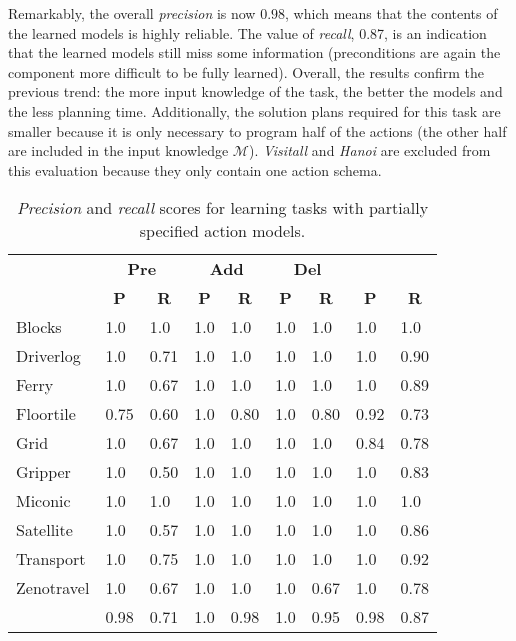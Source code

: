 \documentclass[3p,times]{elsarticle}
\begin{document}
Remarkably, the overall \emph{precision} is now $0.98$, which means that the contents of the learned models is highly reliable. The value of \emph{recall}, 0.87, is an indication that the learned models still miss some information (preconditions are again the component more difficult to be fully learned). Overall, the results confirm the previous trend: the more input knowledge of the task, the better the models and the less planning time. Additionally, the solution plans required for this task are smaller because it is only necessary to program half of the actions (the other half are included in the input knowledge $\mathcal{M}$). {\em Visitall} and {\em Hanoi} are excluded from this evaluation because they only contain one action schema.

\begin{table}[hbt!]
\begin{footnotesize}
	\begin{center}
		
		\begin{tabular}{l|l|l|l|l|l|l||l|l|}
			 & \multicolumn{2}{|c|}{\bf Pre} & \multicolumn{2}{|c|}{\bf Add} & \multicolumn{2}{|c||}{\bf Del} & \multicolumn{2}{|c}{\bf}\\ \cline{2-9}			
			  & \multicolumn{1}{|c|}{\bf P} & \multicolumn{1}{|c|}{\bf R} & \multicolumn{1}{|c|}{\bf P} & \multicolumn{1}{|c|}{\bf R} & \multicolumn{1}{|c|}{\bf P} & \multicolumn{1}{|c||}{\bf R} &  \multicolumn{1}{|c|}{\bf P} & \multicolumn{1}{|c|}{\bf R} \\
			\hline
				Blocks & 1.0 & 1.0 & 1.0 & 1.0 & 1.0 & 1.0 & 1.0 & 1.0 \\
				Driverlog & 1.0 & 0.71 & 1.0 & 1.0 & 1.0 & 1.0 & 1.0 & 0.90 \\
				Ferry & 1.0 & 0.67 & 1.0 & 1.0 & 1.0 & 1.0 & 1.0 & 0.89 \\
				Floortile & 0.75 & 0.60 & 1.0 & 0.80 & 1.0 & 0.80 & 0.92 & 0.73 \\
                Grid & 1.0 & 0.67 & 1.0 & 1.0 & 1.0 & 1.0 & 0.84 & 0.78 \\
				Gripper & 1.0 & 0.50 & 1.0 & 1.0 & 1.0 & 1.0 & 1.0 & 0.83 \\
				Miconic & 1.0 & 1.0 & 1.0 & 1.0 & 1.0 & 1.0 & 1.0 & 1.0 \\
				Satellite & 1.0 & 0.57 & 1.0 & 1.0 & 1.0 & 1.0 & 1.0 & 0.86 \\
				Transport & 1.0 & 0.75 & 1.0 & 1.0 & 1.0 & 1.0 & 1.0 & 0.92 \\
				Zenotravel & 1.0 & 0.67 & 1.0 & 1.0 & 1.0 & 0.67 & 1.0 & 0.78 \\
				\hline
				\bf  & 0.98 & 0.71 & 1.0 & 0.98 & 1.0 & 0.95 & 0.98 & 0.87 \\
			\end{tabular}
		
	\end{center}
\end{footnotesize}
\caption{\small {\em Precision} and {\em recall} scores for learning tasks with partially specified action models.}
\label{tab:results_plans_partial}
\end{table}
\end{document}
